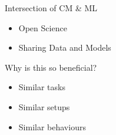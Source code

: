 \documentclass[aspectratio=169]{beamer}
\begin{document}
\begin{frame}{Intersection of CM \& ML}
  \begin{minipage}{0.5\textwidth}
    \begin{itemize}
      \item Open Science 
      \item Sharing Data and Models
    \end{itemize}
  \end{minipage}%
  \begin{minipage}{0.5\textwidth}
    {
      \color{Pink} Why is this so beneficial?
      \begin{itemize}
        \item Similar tasks
        \item Similar setups
        \item Similar behaviours
      \end{itemize}
    }
  \end{minipage}
\end{frame}
\end{document}
